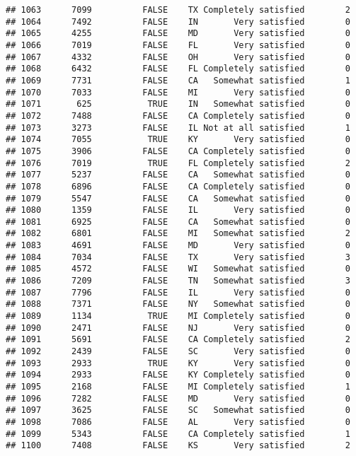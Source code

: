 \documentclass[]{book}
\theoremstyle{definition}
\theoremstyle{definition}
\theoremstyle{remark}
\begin{document}
\begin{verbatim}
## 1063      7099          FALSE    TX Completely satisfied        2
## 1064      7492          FALSE    IN       Very satisfied        0
## 1065      4255          FALSE    MD       Very satisfied        0
## 1066      7019          FALSE    FL       Very satisfied        0
## 1067      4332          FALSE    OH       Very satisfied        0
## 1068      6432          FALSE    FL Completely satisfied        0
## 1069      7731          FALSE    CA   Somewhat satisfied        1
## 1070      7033          FALSE    MI       Very satisfied        0
## 1071       625           TRUE    IN   Somewhat satisfied        0
## 1072      7488          FALSE    CA Completely satisfied        0
## 1073      3273          FALSE    IL Not at all satisfied        1
## 1074      7055           TRUE    KY       Very satisfied        0
## 1075      3906          FALSE    CA Completely satisfied        0
## 1076      7019           TRUE    FL Completely satisfied        2
## 1077      5237          FALSE    CA   Somewhat satisfied        0
## 1078      6896          FALSE    CA Completely satisfied        0
## 1079      5547          FALSE    CA   Somewhat satisfied        0
## 1080      1359          FALSE    IL       Very satisfied        0
## 1081      6925          FALSE    CA   Somewhat satisfied        0
## 1082      6801          FALSE    MI   Somewhat satisfied        2
## 1083      4691          FALSE    MD       Very satisfied        0
## 1084      7034          FALSE    TX       Very satisfied        3
## 1085      4572          FALSE    WI   Somewhat satisfied        0
## 1086      7209          FALSE    TN   Somewhat satisfied        3
## 1087      7796          FALSE    IL       Very satisfied        0
## 1088      7371          FALSE    NY   Somewhat satisfied        0
## 1089      1134           TRUE    MI Completely satisfied        0
## 1090      2471          FALSE    NJ       Very satisfied        0
## 1091      5691          FALSE    CA Completely satisfied        2
## 1092      2439          FALSE    SC       Very satisfied        0
## 1093      2933           TRUE    KY       Very satisfied        0
## 1094      2933          FALSE    KY Completely satisfied        0
## 1095      2168          FALSE    MI Completely satisfied        1
## 1096      7282          FALSE    MD       Very satisfied        0
## 1097      3625          FALSE    SC   Somewhat satisfied        0
## 1098      7086          FALSE    AL       Very satisfied        0
## 1099      5343          FALSE    CA Completely satisfied        1
## 1100      7408          FALSE    KS       Very satisfied        2

\end{verbatim}
\end{document}
